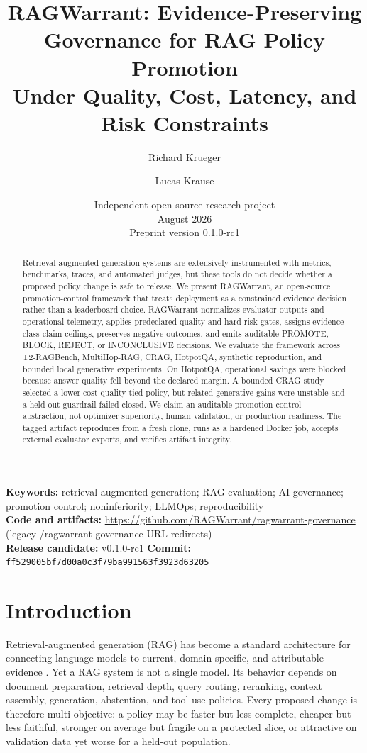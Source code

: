 \documentclass[11pt]{article}
\title{RAGWarrant: Evidence-Preserving Governance for RAG Policy Promotion\\Under Quality, Cost, Latency, and Risk Constraints}
\author{Richard Krueger \and Lucas Krause}
\date{Independent open-source research project \\ August 2026 \\ Preprint version 0.1.0-rc1}
\begin{document}
\maketitle
\nocite{ref1,ref2,ref3,ref4,ref5,ref6,ref7,ref8,ref9,ref10,ref11,ref12,ref13,ref14,ref15,ref16,ref17,ref18,ref19,ref20}
\begin{abstract}
Retrieval-augmented generation systems are extensively instrumented with metrics, benchmarks, traces, and automated judges, but these tools do not decide whether a proposed policy change is safe to release. We present RAGWarrant, an open-source promotion-control framework that treats deployment as a constrained evidence decision rather than a leaderboard choice. RAGWarrant normalizes evaluator outputs and operational telemetry, applies predeclared quality and hard-risk gates, assigns evidence-class claim ceilings, preserves negative outcomes, and emits auditable PROMOTE, BLOCK, REJECT, or INCONCLUSIVE decisions. We evaluate the framework across T2-RAGBench, MultiHop-RAG, CRAG, HotpotQA, synthetic reproduction, and bounded local generative experiments. On HotpotQA, operational savings were blocked because answer quality fell beyond the declared margin. A bounded CRAG study selected a lower-cost quality-tied policy, but related generative gains were unstable and a held-out guardrail failed closed. We claim an auditable promotion-control abstraction, not optimizer superiority, human validation, or production readiness. The tagged artifact reproduces from a fresh clone, runs as a hardened Docker job, accepts external evaluator exports, and verifies artifact integrity.
\end{abstract}

\noindent\textbf{Keywords:} retrieval-augmented generation; RAG evaluation; AI governance; promotion control; noninferiority; LLMOps; reproducibility\\
\textbf{Code and artifacts:} \url{https://github.com/RAGWarrant/ragwarrant-governance} (legacy /ragwarrant-governance URL redirects)\\
\textbf{Release candidate:} v0.1.0-rc1 \quad \textbf{Commit:} \texttt{ff529005bf7d00a0c3f79ba991563f3923d63205}

\section{Introduction}
Retrieval-augmented generation (RAG) has become a standard architecture for connecting language models to current, domain-specific, and attributable evidence \cite{ref1,ref2}. Yet a RAG system is not a single model. Its behavior depends on document preparation, retrieval depth, query routing, reranking, context assembly, generation, abstention, and tool-use policies. Every proposed change is therefore multi-objective: a policy may be faster but less complete, cheaper but less faithful, stronger on average but fragile on a protected slice, or attractive on validation data yet worse for a held-out population.
\end{document}
